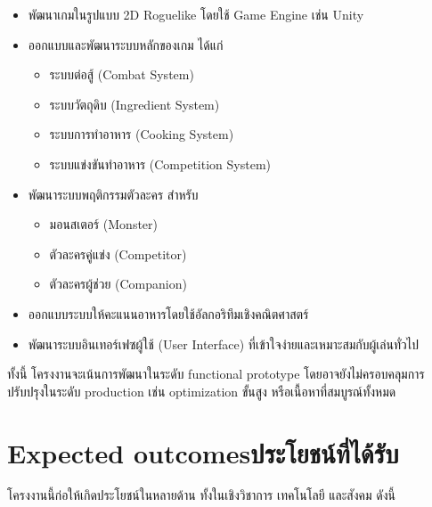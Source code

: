     \begin{itemize}
        \item พัฒนาเกมในรูปแบบ 2D Roguelike โดยใช้ Game Engine เช่น Unity
        \item ออกแบบและพัฒนาระบบหลักของเกม ได้แก่
            \begin{itemize}
                \item ระบบต่อสู้ (Combat System) 
                \item ระบบวัตถุดิบ (Ingredient System)
                \item ระบบการทำอาหาร (Cooking System)
                \item ระบบแข่งขันทำอาหาร (Competition System)
            \end{itemize}
        \item พัฒนาระบบพฤติกรรมตัวละคร สำหรับ
            \begin{itemize}
                \item มอนสเตอร์ (Monster)
                \item ตัวละครคู่แข่ง (Competitor)
                \item ตัวละครผู้ช่วย (Companion)
            \end{itemize}
        \item ออกแบบระบบให้คะแนนอาหารโดยใช้อัลกอริทึมเชิงคณิตศาสตร์
        \item พัฒนาระบบอินเทอร์เฟซผู้ใช้ (User Interface) ที่เข้าใจง่ายและเหมาะสมกับผู้เล่นทั่วไป
    \end{itemize}

    ทั้งนี้ โครงงานจะเน้นการพัฒนาในระดับ functional prototype โดยอาจยังไม่ครอบคลุมการปรับปรุงในระดับ production เช่น optimization ขั้นสูง หรือเนื้อหาที่สมบูรณ์ทั้งหมด

\section{\ifenglish Expected outcomes\else ประโยชน์ที่ได้รับ\fi}

    \hspace{1.5em}โครงงานนี้ก่อให้เกิดประโยชน์ในหลายด้าน ทั้งในเชิงวิชาการ เทคโนโลยี และสังคม ดังนี้

